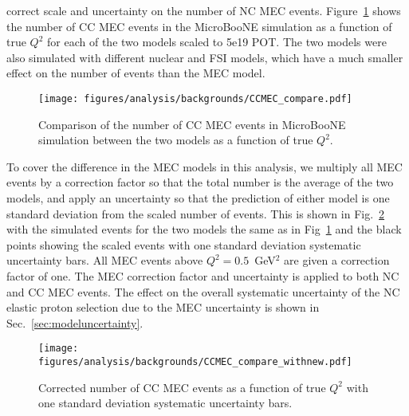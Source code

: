     correct scale and uncertainty on the number of NC MEC events.
    Figure~\ref{fig:ccmec} shows the number of CC MEC events in the MicroBooNE
    simulation as a function of true $Q^2$ for each of the two models scaled to
    5e19 POT. The two models were also simulated with different nuclear and FSI
    models, which have a much smaller effect on the number of events than the
    MEC model.
    \begin{figure}[ht]
      \centering
      \texttt{[image: figures/analysis/backgrounds/CCMEC\_compare.pdf]}
      \caption{Comparison of the number of CC MEC events in MicroBooNE
      simulation between the two models as a function of true $Q^2$.}
      \label{fig:ccmec}
    \end{figure}

    To cover the difference in the MEC models in this analysis, we multiply all
    MEC events by a correction factor so that the total number is the average
    of the two models, and apply an uncertainty so that the prediction of
    either model is one standard deviation from the scaled number of events.
    This is shown in Fig.~\ref{fig:ccmecscale} with the simulated events for
    the two models the same as in Fig~\ref{fig:ccmec} and the black points
    showing the scaled events with one standard deviation systematic
    uncertainty bars. All MEC events above $Q^2 = 0.5$~GeV$^2$ are given a
    correction factor of one. The MEC correction factor and uncertainty is
    applied to both NC and CC MEC events. The effect on the overall systematic
    uncertainty of the NC elastic proton selection due to the MEC uncertainty
    is shown in Sec.~\ref{sec:modeluncertainty}.
    \begin{figure}[ht]
      \centering
      \texttt{[image: figures/analysis/backgrounds/CCMEC\_compare\_withnew.pdf]}
      \caption{Corrected number of CC MEC events as a function of true $Q^2$ with
      one standard deviation systematic uncertainty bars.}
      \label{fig:ccmecscale}
    \end{figure}

